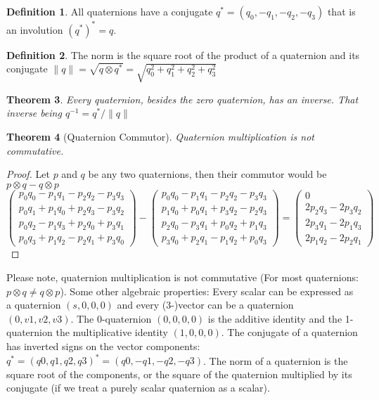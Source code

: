 \documentclass{amsart}
\newtheorem{theorem}{Theorem}[section]
\theoremstyle{definition}
\newtheorem{definition}[theorem]{Definition}
\theoremstyle{remark}
\numberwithin{equation}{section}
\begin{document}
\begin{definition}
  All quaternions have a conjugate $q^*=(q_0,-q_1,-q_2,-q_3)$ that is an involution $(q^*)^*=q$.
\end{definition}

\begin{definition}
  The norm is the square root of the product of a quaternion and its conjugate $\|q\|=\sqrt{q\otimes q^*}=\sqrt{q_0^2+q_1^2+q_2^2+q_3^2}$
\end{definition}

\begin{theorem}
  Every quaternion, besides the zero quaternion, has an inverse. That inverse being $q^{-1} = q^*/\|q\|$
\end{theorem}

\begin{theorem}[Quaternion Commutor]
  Quaternion multiplication is not commutative.
\end{theorem}
\begin{proof}
  Let $p$ and $q$ be any two quaternions, then their commutor would be $p\otimes q-q\otimes p$
  \begin{equation}
    \begin{pmatrix}
      p_0q_0 - p_1q_1 - p_2q_2 - p_3q_3 \\
      p_0q_1 + p_1q_0 + p_2q_3 - p_3q_2 \\
      p_0q_2 - p_1q_3 + p_2q_0 + p_3q_1 \\
      p_0q_3 + p_1q_2 - p_2q_1 + p_3q_0
    \end{pmatrix} -
    \begin{pmatrix}
      p_0q_0 - p_1q_1 - p_2q_2 - p_3q_3 \\
      p_1q_0 + p_0q_1 + p_3q_2 - p_2q_3 \\
      p_2q_0 - p_3q_1 + p_0q_2 + p_1q_3 \\
      p_3q_0 + p_2q_1 - p_1q_2 + p_0q_3
    \end{pmatrix} =
    \begin{pmatrix}
      0 \\
      2p_2q_3-2p_3q_2\\
      2p_3q_1-2p_1q_3\\
      2p_1q_2-2p_2q_1
    \end{pmatrix}
  \end{equation}
\end{proof}



Please note, quaternion multiplication is not commutative (For most quaternions: $p\otimes q\neq q \otimes p$). Some other algebraic properties:
Every scalar can be expressed as a quaternion $(s, 0, 0, 0)$ and every (3-)vector can be a quaternion $(0, v1, v2, v3)$. The 0-quaternion $(0, 0, 0, 0)$ is the additive identity and the 1-quaternion the multiplicative identity $(1, 0, 0, 0)$. The conjugate of a quaternion has inverted signs on the vector components: $q^*=(q0, q1, q2, q3)^*=(q0, -q1, -q2, -q3)$. The norm of a quaternion is the square root of the components, or the square of the quaternion multiplied by its conjugate (if we treat a purely scalar quaternion as a scalar).
\end{document}
